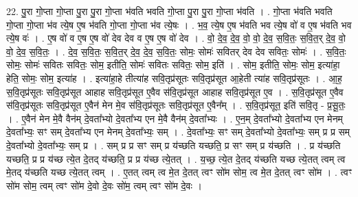\documentclass[17pt]{extarticle}
\begin{document}
22. पु॒रा गो॒प्ता गो॒प्ता पु॒रा पु॒रा गो॒प्ता भ॑वति भवति गो॒प्ता पु॒रा पु॒रा गो॒प्ता भ॑वति । . गो॒प्ता भ॑वति भवति गो॒प्ता गो॒प्ता भ॑व त्ये॒ष ए॒ष भ॑वति गो॒प्ता गो॒प्ता भ॑व त्ये॒षः । . भ॒व॒ त्ये॒ष ए॒ष भ॑वति भव त्ये॒ष वो॑ व ए॒ष भ॑वति भव त्ये॒ष वः॑ । . ए॒ष वो॑ व ए॒ष ए॒ष वो॑ देव देव व ए॒ष ए॒ष वो॑ देव । . वो॒ दे॒व॒ दे॒व॒ वो॒ वो॒ दे॒व॒ स॒वि॒तः॒ स॒वि॒त॒र् दे॒व॒ वो॒ वो॒ दे॒व॒ स॒वि॒तः॒ । . दे॒व॒ स॒वि॒तः॒ स॒वि॒त॒र् दे॒व॒ दे॒व॒ स॒वि॒तः॒ सोमः॒ सोमः॑ सवितर् देव देव सवितः॒ सोमः॑ । . स॒वि॒तः॒ सोमः॒ सोमः॑ सवितः सवितः॒ सोम॒ इतीति॒ सोमः॑ सवितः सवितः॒ सोम॒ इति॑ । . सोम॒ इतीति॒ सोमः॒ सोम॒ इत्या॑हा॒ हेति॒ सोमः॒ सोम॒ इत्या॑ह । . इत्या॑हा॒हे तीत्या॑ह सवि॒तृप्र॑सूतः सवि॒तृप्र॑सूत आ॒हेती त्या॑ह सवि॒तृप्र॑सूतः । . आ॒ह॒ स॒वि॒तृप्र॑सूतः सवि॒तृप्र॑सूत आहाह सवि॒तृप्र॑सूत ए॒वैव स॑वि॒तृप्र॑सूत आहाह सवि॒तृप्र॑सूत ए॒व । . स॒वि॒तृप्र॑सूत ए॒वैव स॑वि॒तृप्र॑सूतः सवि॒तृप्र॑सूत ए॒वैन॑ मेन मे॒व स॑वि॒तृप्र॑सूतः सवि॒तृप्र॑सूत ए॒वैन᳚म् । . स॒वि॒तृप्र॑सूत॒ इति॑ सवि॒तृ - प्र॒सू॒तः॒ । . ए॒वैन॑ मेन मे॒वै वैन॑म् दे॒वता᳚भ्यो दे॒वता᳚भ्य एन मे॒वै वैन॑म् दे॒वता᳚भ्यः । . ए॒न॒म् दे॒वता᳚भ्यो दे॒वता᳚भ्य एन मेनम् दे॒वता᳚भ्यः॒ सꣳ सम् दे॒वता᳚भ्य एन मेनम् दे॒वता᳚भ्यः॒ सम् । . दे॒वता᳚भ्यः॒ सꣳ सम् दे॒वता᳚भ्यो दे॒वता᳚भ्यः॒ सम् प्र प्र सम् दे॒वता᳚भ्यो दे॒वता᳚भ्यः॒ सम् प्र । . सम् प्र प्र सꣳ सम् प्र य॑च्छति यच्छति॒ प्र सꣳ सम् प्र य॑च्छति । . प्र य॑च्छति यच्छति॒ प्र प्र य॑च्छ त्ये॒त दे॒तद् य॑च्छति॒ प्र प्र य॑च्छ त्ये॒तत् । . य॒च्छ॒ त्ये॒त दे॒तद् य॑च्छति यच्छ त्ये॒तत् त्वम् त्व मे॒तद् य॑च्छति यच्छ त्ये॒तत् त्वम् । . ए॒तत् त्वम् त्व मे॒त दे॒तत् त्वꣳ सो॑म सोम॒ त्व मे॒त दे॒तत् त्वꣳ सो॑म । . त्वꣳ सो॑म सोम॒ त्वम् त्वꣳ सो॑म दे॒वो दे॒वः सो॑म॒ त्वम् त्वꣳ सो॑म दे॒वः । \newline
\end{document}
